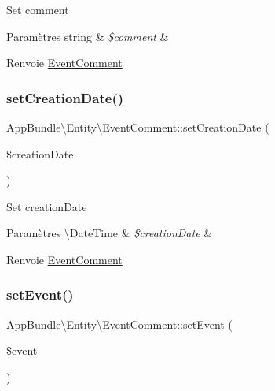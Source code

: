 Set comment


\begin{DoxyParams}[1]{Paramètres}
string & {\em \$comment} & \\
\hline
\end{DoxyParams}
\begin{DoxyReturn}{Renvoie}
\hyperlink{classAppBundle_1_1Entity_1_1EventComment}{Event\+Comment} 
\end{DoxyReturn}
\mbox{\label{classAppBundle_1_1Entity_1_1EventComment_a620976f19d00e547d52009a2888e33dc}} 
\subsubsection{\texorpdfstring{set\+Creation\+Date()}{setCreationDate()}}
{\footnotesize\ttfamily App\+Bundle\textbackslash{}\+Entity\textbackslash{}\+Event\+Comment\+::set\+Creation\+Date (\begin{DoxyParamCaption}\item[{}]{\$creation\+Date }\end{DoxyParamCaption})}

Set creation\+Date


\begin{DoxyParams}[1]{Paramètres}
\textbackslash{}\+Date\+Time & {\em \$creation\+Date} & \\
\hline
\end{DoxyParams}
\begin{DoxyReturn}{Renvoie}
\hyperlink{classAppBundle_1_1Entity_1_1EventComment}{Event\+Comment} 
\end{DoxyReturn}
\mbox{\label{classAppBundle_1_1Entity_1_1EventComment_ab2ea9eb99d49939f4ff925f127a14c14}} 
\subsubsection{\texorpdfstring{set\+Event()}{setEvent()}}
{\footnotesize\ttfamily App\+Bundle\textbackslash{}\+Entity\textbackslash{}\+Event\+Comment\+::set\+Event (\begin{DoxyParamCaption}\item[{\textbackslash{}\hyperlink{classAppBundle_1_1Entity_1_1Event}{App\+Bundle\textbackslash{}\+Entity\textbackslash{}\+Event}}]{\$event }\end{DoxyParamCaption})}

